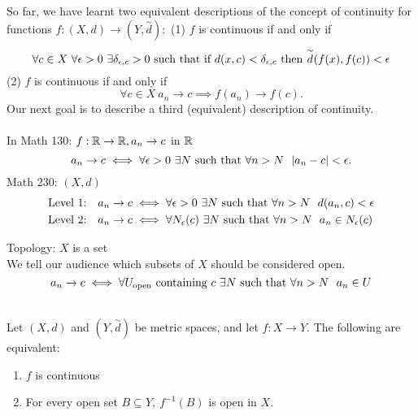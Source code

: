 So far, we have learnt two equivalent descriptions of the concept of continuity for functions $f: (X,d) \to (Y, \overset{\sim}{d}):$
(1) $f$ is continuous if and only if
$$\forall c \in X ~\forall \epsilon > 0 ~\exists \delta_{\epsilon, c} > 0 \text{ such that } \text{if $d(x,c) < \delta_{\epsilon, c}$ then $\overset{\sim}{d}(f(x), f(c)) < \epsilon$}$$
(2) $f$ is continuous if and only if
$$\forall c \in X ~a_n \to c \implies f(a_n) \to f(c).$$
Our next goal is to describe a third (equivalent) description of continuity. \\ \\
In Math 130: $f:\mathbb{R} \to \mathbb{R}, a_n \to c$ in $\mathbb{R}$
$$a_n \to c \iff \forall \epsilon > 0 ~\exists N \text{ such that } \forall n > N ~~|a_n - c| < \epsilon.$$
Math 230: $(X,d)$
\begin{align*}
    &\text{Level 1:} && a_n \to c \iff \forall \epsilon > 0 ~\exists N \text{ such that } \forall n > N ~~d(a_n, c) < \epsilon \\
    &\text{Level 2:} && a_n \to c \iff \forall N_{\epsilon}(c) ~\exists N \text{ such that } \forall n > N ~~a_n \in N_{\epsilon}(c)
\end{align*}

\noindent
Topology: $X$ is a set \\
We tell our audience which subsets of $X$ should be considered open.
$$a_n \to c \iff \forall U_{\text{open}} \text{ containing } c ~\exists N \text{ such that } \forall n > N ~~a_n \in U$$

\begin{theorem} \leavevmode \\
  \label{thm4.8}
  Let $(X,d)$ and $(Y, \overset{\sim}{d})$ be metric spaces, and let $f: X \to Y.$ The following are equivalent:
  \begin{enumerate}[$(i)$]
    \item $f$ is continuous
    \item For every open set $B \subseteq Y, ~ f^{-1}(B)$ is open in $X$.
  \end{enumerate}  
\end{theorem}

